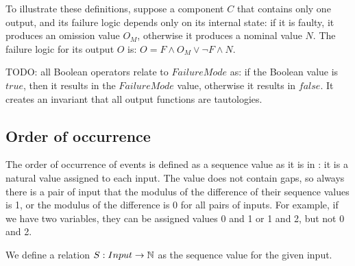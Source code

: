 %
%

To illustrate these definitions, suppose a component $C$ that contains only one output, and its failure logic depends only on its internal state: if it is faulty, it produces an omission value $O_M$, otherwise it produces a nominal value $N$. 
%
The failure logic for its output $O$ is: $O = F \land O_M \lor \lnot F \land N$.

TODO: all Boolean operators relate to $FailureMode$ as: if the Boolean value is $true$, then it results in the $FailureMode$ value, otherwise it results in $false$. It creates an invariant that all output functions are tautologies.

\subsection{Order of occurrence}

The order of occurrence of events is defined as a sequence value as it is in \HIPHOPS: it is a natural value assigned to each input.
%
The value does not contain gaps, so always there is a pair of input that the modulus of the difference of their sequence values is 1, or the modulus of the difference is 0 for all pairs of inputs.
%
For example, if we have two variables, they can be assigned values 0 and 1 or 1 and 2, but not 0 and 2. 

We define a relation $S : Input \rightarrow \mathbb{N} $ as the sequence value for the given input.

